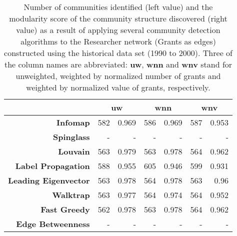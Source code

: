 \begin{table}[!htbp]
\centering
\caption[Number of communities and modularity score of community structure identified within the Researcher network (Grants as edges) constructed using the historical data set (1990 to 2000)]{Number of communities identified (left value) and the modularity score of the community structure discovered (right value) as a result of applying several community detection algorithms to the Researcher network (Grants as edges) constructed using the historical data set (1990 to 2000). Three of the column names are abbreviated: \textbf{uw}, \textbf{wnn} and \textbf{wnv} stand for unweighted, weighted by normalized number of grants and weighted by normalized value of grants, respectively.}
\label{table:researcher_b_past1_modularity_appendix}
\begin{tabular}{r|rr|rr|rr}
\textbf{} & \multicolumn{2}{c|}{\textbf{uw}} & \multicolumn{2}{c|}{\textbf{wnn}} & \multicolumn{2}{c}{\textbf{wnv}}\\
\hline
\textbf{Infomap} & {582} & {0.969} & {586} & {0.969} & {587} & {0.953}\\
\textbf{Spinglass} & {-} & {-} & {-} & {-} & {-} & {-}\\
\textbf{Louvain} & {563} & {0.979} & {563} & {0.978} & {564} & {0.962}\\
\textbf{Label Propagation} & {588} & {0.955} & {605} & {0.946} & {599} & {0.931}\\
\textbf{Leading Eigenvector} & {563} & {0.978} & {564} & {0.978} & {563} & {0.96}\\
\textbf{Walktrap} & {563} & {0.977} & {564} & {0.974} & {564} & {0.952}\\
\textbf{Fast Greedy} & {562} & {0.978} & {563} & {0.978} & {564} & {0.962}\\
\textbf{Edge Betweenness} & {-} & {-} & {-} & {-} & {-} & {-}
\end{tabular}
\end{table}

